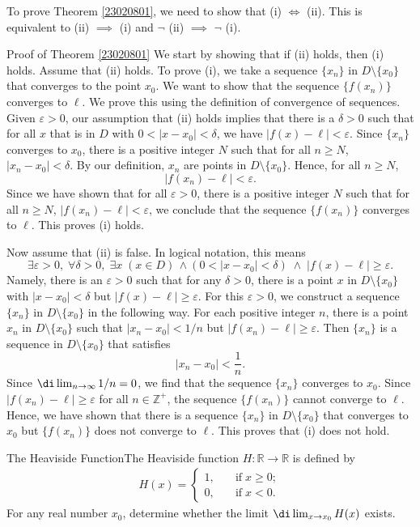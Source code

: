  To prove Theorem \ref{23020801}, we need to show that (i) $\iff$ (ii). This is equivalent to (ii) $\implies$ (i) and $\neg$ (ii) $\implies$ $\neg$ (i). 
 \begin{myproof}{\linkt Proof of Theorem \ref{23020801}}
 We start by  showing that if (ii) holds, then (i) holds. Assume that (ii) holds. To prove (i), we take a sequence $\{x_n\}$ in $D\setminus\{x_0\}$ that converges to the point $x_0$. We want to show that the sequence $\{f(x_n)\}$ converges to $\ell$. We prove this using the definition of convergence of sequences. 
  Given $\varepsilon>0$, our assumption that (ii) holds implies that there is a $\delta>0$ such that for all $x$ that is in $D$ with $0<|x-x_0|<\delta$, we have $|f(x)-\ell|<\varepsilon$. Since $\{x_n\}$ converges to $x_0$, there is a positive integer $N$ such that for all $n\geq N$, $|x_n-x_0|<\delta$. By our definition, $x_n$ are points in $D\setminus \{x_0\}$. Hence, for all $n\geq N$,  
 \[|f(x_n)-\ell|<\varepsilon.\]Since we have shown that for all $\varepsilon>0$, there is a positive integer $N$ such that for all $n\geq N$, $|f(x_n)-\ell|<\varepsilon$, we conclude that the sequence $\{f(x_n)\}$ converges to $\ell$. This proves (i) holds.
 
Now assume that (ii) is false.  In logical notation, this means
\[\exists  \varepsilon>0, \;\forall \delta>0,\;\exists x\; (x\in D)\,\wedge (0<|x-x_0|<\delta)\;\wedge\;|f(x)-\ell|\geq \varepsilon.\] 
Namely, there is an $\varepsilon>0$ such that for any $\delta>0$, there is a point $x$ in $D\setminus\{x_0\}$ with $|x-x_0|<\delta$ but $|f(x)-\ell|\geq \varepsilon$.
For this $\varepsilon>0$, we  construct a sequence $\{x_n\}$ in $D\setminus \{x_0\}$ in the following way. For each positive integer $n$, there is a point $x_n$ in $D\setminus\{x_0\}$ such that
$|x_n-x_0|<1/n$ but $|f(x_n)-\ell|\geq\varepsilon$.
Then $\{x_n\}$ is a sequence in $D\setminus\{x_0\}$ that satisfies
\[|x_n-x_0|<\frac{1}{n}.\]
Since $\di\lim_{n\rightarrow \infty}1/n=0$, we find that the sequence $\{x_n\}$ converges to $x_0$. Since $|f(x_n)-\ell|\geq \varepsilon$ for all $n\in\mathbb{Z}^+$, the sequence $\{f(x_n)\}$ cannot converge to $\ell$. Hence, we have shown that there is a sequence $\{x_n\}$ in $D\setminus \{x_0\}$ that converges to $x_0$ but $\{f(x_n)\}$ does not converge to $\ell$. This proves that (i) does not hold.
 \end{myproof}
 
 \begin{example}[label=23020808]
 {The Heaviside Function}The Heaviside function  $H:\mathbb{R}\rightarrow\mathbb{R}$ is  defined by
 \begin{align*}
 H(x)=\begin{cases}1,\quad &\text{if}\; x\geq 0;
 \\0,\quad & \text{if}\;x<0.\end{cases}
 \end{align*}
 For any  real number $x_0$, determine whether the limit $\di\lim_{x\rightarrow x_0}H(x)$ exists.
 \end{example}
 
